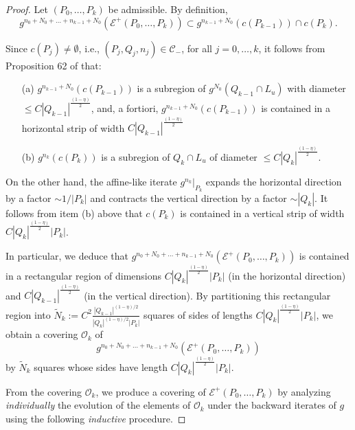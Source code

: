 \documentclass[12pt]{amsart}
\numberwithin{equation}{section}
\theoremstyle{definition}
\newcommand{\<}{{\langle}}
\renewcommand{\>}{{\rangle}}
\begin{document}
\begin{proof} Let $(P_0,\dots, P_k)$ be admissible. By definition, 
$$g^{n_0+N_0+\dots+n_{k-1}+N_0}(\mathcal{E}^+(P_0,\dots,P_k))\subset g^{n_{k-1}+N_0}(c(P_{k-1}))\cap c(P_k).$$ 

Since $c(P_j)\neq\emptyset$, i.e., $(P_j,Q_j,n_j)\in\mathcal{C}_-$, for all $j=0, \dots, k$, it follows from Proposition 62 of \cite{PY09} that:
\begin{itemize}
\item[(a)] $g^{n_{k-1}+N_0}(c(P_{k-1}))$ is a subregion of $g^{N_0}(Q_{k-1}\cap L_u)$ with diameter $\leq C|Q_{k-1}|^{\frac{(1-\eta)}{2}}$, and, a fortiori, $g^{n_{k-1}+N_0}(c(P_{k-1}))$ is contained in a horizontal strip of width $C|Q_{k-1}|^{\frac{(1-\eta)}{2}}$
\item[(b)] $g^{n_k}(c(P_k))$ is a subregion of $Q_k\cap L_u$ of diameter $\leq C|Q_k|^{\frac{(1-\eta)}{2}}$. 
\end{itemize}
On the other hand, the affine-like iterate $g^{n_k}|_{P_k}$ expands the horizontal direction by a factor $\sim 1/|P_k|$ and contracts the vertical direction by a factor $\sim |Q_k|$. It follows from item (b) above that $c(P_k)$ is contained in a vertical strip of width $C|Q_k|^{\frac{(1-\eta)}{2}}|P_k|$. 

\begin{figure}[htb!]

\end{figure}

In particular, we deduce that $g^{n_0+N_0+\dots+n_{k-1}+N_0}(\mathcal{E}^+(P_0,\dots,P_k))$ is contained in a rectangular region of dimensions $C|Q_k|^{\frac{(1-\eta)}{2}}|P_k|$ (in the horizontal direction) and $C|Q_{k-1}|^{\frac{(1-\eta)}{2}}$ (in the vertical direction). By partitioning this rectangular region into $\widetilde{N}_k:= C^2 \frac{|Q_{k-1}|^{(1-\eta)/2}}{|Q_k|^{(1-\eta)/2} |P_k|}$ squares of sides of lengths $C|Q_k|^{\frac{(1-\eta)}{2}}|P_k|$, we obtain a covering $\mathcal{O}_k$ of 
$$g^{n_0+N_0+\dots+n_{k-1}+N_0}(\mathcal{E}^+(P_0,\dots,P_k))$$ by $\widetilde{N}_k$ squares whose sides have length $C|Q_k|^{\frac{(1-\eta)}{2}}|P_k|$. 

From the covering $\mathcal{O}_k$, we produce a covering of $\mathcal{E}^+(P_0,\dots,P_k)$ by analyzing \emph{individually} the evolution of the elements of $\mathcal{O}_k$ under the backward iterates of $g$ using the following \emph{inductive} procedure. 


\end{proof}
\end{document}
